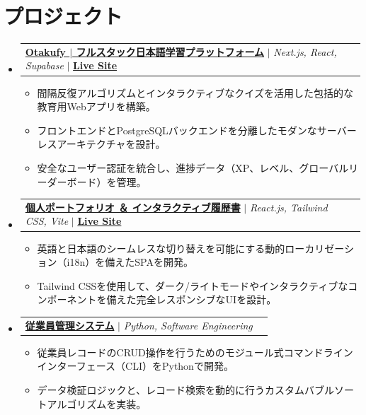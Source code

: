 \documentclass[letterpaper,11pt]{article}
\makeatletter
\newcommand{\resumeItem}[1]{
  \item\small{#1}
}
\newcommand{\resumeProjectHeading}[2]{
    \item
    \begin{tabular*}{0.97\textwidth}[t]{l@{\extracolsep{\fill}}r}
      \small#1 & #2 \\
    \end{tabular*}\vspace{2pt}
}
\newcommand{\resumeSubHeadingListStart}{\begin{itemize}[leftmargin=0.15in, label={}, itemsep=5pt, parsep=0pt]}
\newcommand{\resumeSubHeadingListEnd}{\end{itemize}}
\newcommand{\resumeItemListStart}{\begin{itemize}[itemsep=2pt, parsep=0pt, topsep=0pt, partopsep=0pt]}
\newcommand{\resumeItemListEnd}{\end{itemize}}
\makeatother
\begin{document}
\section{プロジェクト}
    \resumeSubHeadingListStart
      \resumeProjectHeading
          {\href{https://github.com/NotCatfish/otakufy}{\textbf{Otakufy $|$ フルスタック日本語学習プラットフォーム}} $|$ \emph{Next.js, React, Supabase} $|$ \href{https://otakufy.vercel.app/}{\textbf{Live Site}}}{}
          \resumeItemListStart
            \resumeItem{間隔反復アルゴリズムとインタラクティブなクイズを活用した包括的な教育用Webアプリを構築。}
            \resumeItem{フロントエンドとPostgreSQLバックエンドを分離したモダンなサーバーレスアーキテクチャを設計。}
            \resumeItem{安全なユーザー認証を統合し、進捗データ（XP、レベル、グローバルリーダーボード）を管理。}
          \resumeItemListEnd
      \resumeProjectHeading
          {\href{https://github.com/NotCatfish/portfolio}{\textbf{個人ポートフォリオ ＆ インタラクティブ履歴書}} $|$ \emph{React.js, Tailwind CSS, Vite} $|$ \href{https://indraneelsamanta.vercel.app/}{\textbf{Live Site}}}{}
          \resumeItemListStart
            \resumeItem{英語と日本語のシームレスな切り替えを可能にする動的ローカリゼーション（i18n）を備えたSPAを開発。}
            \resumeItem{Tailwind CSSを使用して、ダーク/ライトモードやインタラクティブなコンポーネントを備えた完全レスポンシブなUIを設計。}
          \resumeItemListEnd
      \resumeProjectHeading
          {\href{https://github.com/NotCatfish/employeeManagementSystem}{\textbf{従業員管理システム}} $|$ \emph{Python, Software Engineering}}{}
          \resumeItemListStart
            \resumeItem{従業員レコードのCRUD操作を行うためのモジュール式コマンドラインインターフェース（CLI）をPythonで開発。}
            \resumeItem{データ検証ロジックと、レコード検索を動的に行うカスタムバブルソートアルゴリズムを実装。}
          \resumeItemListEnd
    \resumeSubHeadingListEnd

\end{document}
